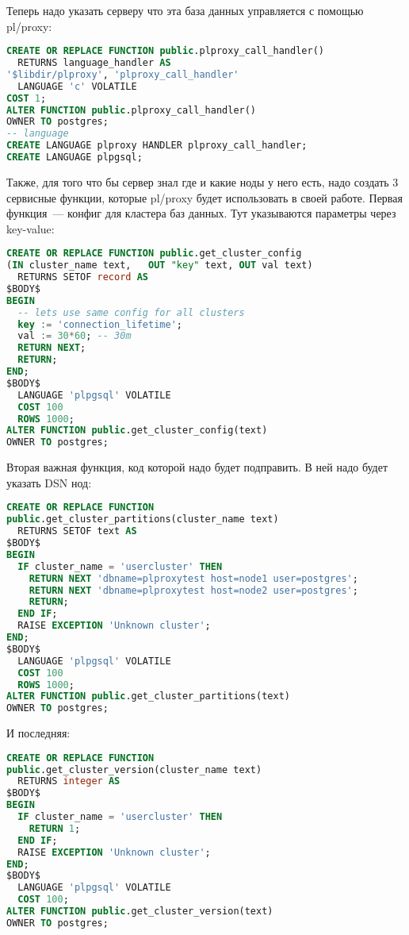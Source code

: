 Теперь надо указать серверу что эта база данных управляется с помощью pl/proxy:
\begin{lstlisting}[language=SQL,label=lst:plproxy6,caption=Настройка]
CREATE OR REPLACE FUNCTION public.plproxy_call_handler()
  RETURNS language_handler AS
'$libdir/plproxy', 'plproxy_call_handler'
  LANGUAGE 'c' VOLATILE
COST 1;
ALTER FUNCTION public.plproxy_call_handler()
OWNER TO postgres;
-- language
CREATE LANGUAGE plproxy HANDLER plproxy_call_handler;
CREATE LANGUAGE plpgsql;
\end{lstlisting}

Также, для того что бы сервер знал где и какие ноды у него есть, надо создать 3 сервисные функции, которые pl/proxy будет использовать в своей работе. Первая функция~--- конфиг для кластера баз данных. Тут указываются параметры через key-value:
\begin{lstlisting}[language=SQL,label=lst:plproxy7,caption=Настройка]
CREATE OR REPLACE FUNCTION public.get_cluster_config
(IN cluster_name text,   OUT "key" text, OUT val text)
  RETURNS SETOF record AS
$BODY$
BEGIN
  -- lets use same config for all clusters
  key := 'connection_lifetime';
  val := 30*60; -- 30m
  RETURN NEXT;
  RETURN;
END;
$BODY$
  LANGUAGE 'plpgsql' VOLATILE
  COST 100
  ROWS 1000;
ALTER FUNCTION public.get_cluster_config(text)
OWNER TO postgres;
\end{lstlisting}

Вторая важная функция, код которой надо будет подправить. В ней надо будет указать DSN нод:
\begin{lstlisting}[language=SQL,label=lst:plproxy8,caption=Настройка]
CREATE OR REPLACE FUNCTION
public.get_cluster_partitions(cluster_name text)
  RETURNS SETOF text AS
$BODY$
BEGIN
  IF cluster_name = 'usercluster' THEN
    RETURN NEXT 'dbname=plproxytest host=node1 user=postgres';
    RETURN NEXT 'dbname=plproxytest host=node2 user=postgres';
    RETURN;
  END IF;
  RAISE EXCEPTION 'Unknown cluster';
END;
$BODY$
  LANGUAGE 'plpgsql' VOLATILE
  COST 100
  ROWS 1000;
ALTER FUNCTION public.get_cluster_partitions(text)
OWNER TO postgres;
\end{lstlisting}

И последняя:
\begin{lstlisting}[language=SQL,label=lst:plproxy9,caption=Настройка]
CREATE OR REPLACE FUNCTION
public.get_cluster_version(cluster_name text)
  RETURNS integer AS
$BODY$
BEGIN
  IF cluster_name = 'usercluster' THEN
    RETURN 1;
  END IF;
  RAISE EXCEPTION 'Unknown cluster';
END;
$BODY$
  LANGUAGE 'plpgsql' VOLATILE
  COST 100;
ALTER FUNCTION public.get_cluster_version(text)
OWNER TO postgres;
\end{lstlisting}

